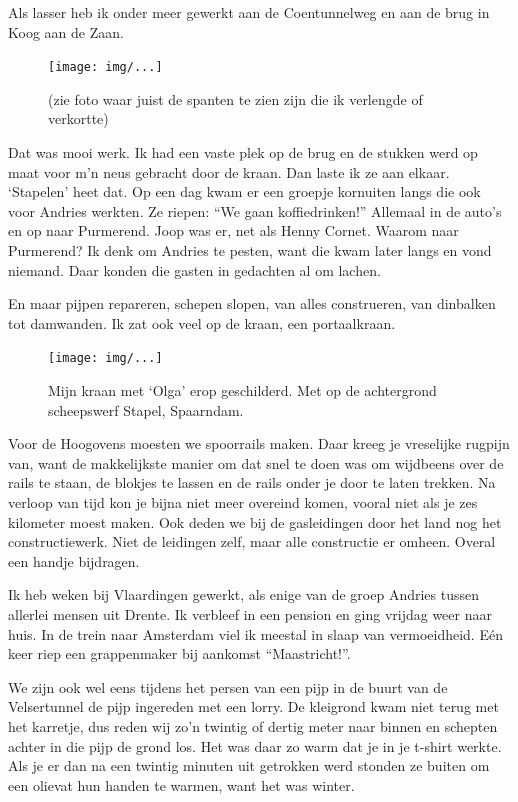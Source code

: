 \documentclass[12pt,twoside]{memoir}
\begin{document}
Als lasser heb ik onder meer gewerkt aan de Coentunnelweg en aan de brug in Koog aan de Zaan. 

\begin{figure}[t]
\texttt{[image: img/...]}
\caption{(zie foto waar juist de spanten te zien zijn die ik verlengde of verkortte)}
\end{figure}

Dat was mooi werk. Ik had een vaste plek op de brug en de stukken werd op maat voor m’n neus gebracht door de kraan. Dan laste ik ze aan elkaar. `Stapelen' heet dat. Op een dag kwam er een groepje kornuiten langs die ook voor Andries werkten. Ze riepen: ``We gaan koffiedrinken!'' Allemaal in de auto’s en op naar Purmerend. Joop was er, net als Henny Cornet. Waarom naar Purmerend? Ik denk om Andries te pesten, want die kwam later langs en vond niemand. Daar konden die gasten in gedachten al om lachen.

En maar pijpen repareren, schepen slopen, van alles construeren, van dinbalken tot damwanden. Ik zat ook veel op de kraan, een portaalkraan. 

\begin{figure}[t]
\texttt{[image: img/...]}
\caption{Mijn kraan met ‘Olga’ erop geschilderd. Met op de achtergrond scheepswerf Stapel, Spaarndam.}
\end{figure}

Voor de Hoogovens moesten we spoorrails maken. Daar kreeg je vreselijke rugpijn van, want de makkelijkste manier om dat snel te doen was om wijdbeens over de rails te staan, de blokjes te lassen en de rails onder je door te laten trekken. Na verloop van tijd kon je bijna niet meer overeind komen, vooral niet als je zes kilometer moest maken. Ook deden we bij de gasleidingen door het land nog het constructiewerk. Niet de leidingen zelf, maar alle constructie er omheen. Overal een handje bijdragen.

Ik heb weken bij Vlaardingen gewerkt, als enige van de groep Andries tussen allerlei mensen uit Drente. Ik verbleef in een pension en ging vrijdag weer naar huis. In de trein naar Amsterdam viel ik meestal in slaap van vermoeidheid. Eén keer riep een grappenmaker bij aankomst ``Maastricht!''. 

We zijn ook wel eens tijdens het persen van een pijp in de buurt van de Velsertunnel de pijp ingereden met een lorry. De kleigrond kwam niet terug met het karretje, dus reden wij zo'n twintig of dertig meter naar binnen en schepten achter in die pijp de grond los. Het was daar zo warm dat je in je t-shirt werkte. Als je er dan na een twintig minuten uit getrokken werd stonden ze buiten om een olievat hun handen te warmen, want het was winter. 
\end{document}
